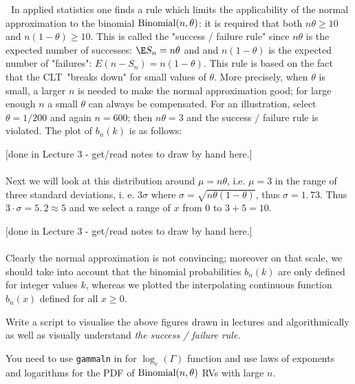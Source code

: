 \textbf{\ }In applied statistics one finds a rule which limits the
applicability of the normal approximation to the binomial $\mbox{{\rm Binomial}}(n,\theta)$: it is
required that both $n\theta\geq 10$ and $n(1-\theta)\geq 10$. This is called the
"success / failure rule" since $n\theta$ is the expected number of successes: $%
\E S_{n}=n\theta$ and and $n(1-\theta)$ is the expected number of "failures": $E\left(
n-S_{n}\right) =n(1-\theta)$. This rule is based on the fact that the CLT\
"breaks down" for small values of $\theta$. More precisely, when $\theta$ is small, a
larger $n$ is needed to make the normal approximation good; for large enough 
$n$ a small $\theta$ can always be compensated. For an illustration, select $%
\theta=1/200$ and again $n=600$; then $n\theta=3$ and the success / failure rule is
violated. The plot of $b_{n}(k)$ is as follows:


{\scriptsize [done in Lecture 3 - get/read notes to draw by hand here.]}\\
\vspace{3cm} 
~\\


Next we will look at this distribution around $\mu =n\theta$, i.e. $%
\mu =3$ in the range of three standard deviations, i. e. $3\sigma $ where $%
\sigma =\sqrt{n\theta(1-\theta)}$, thus $\sigma =1.\,73$. Thus $3\cdot \sigma
=5.\,2\approx 5$ and we select a range of $x$ from $0$ to $3+5=10$. 


{\scriptsize [done in Lecture 3 - get/read notes to draw by hand here.]}\\
\vspace{3cm} 
~\\


Clearly the normal
approximation is not convincing; moreover on that scale, we should take into
account that the binomial probabilities $b_{n}(k)$ are only defined for
integer values $k$, whereas we plotted the interpolating continuous function 
$b_{n}(x)$ defined for all $x\geq 0$.

\begin{labwork}\label{LW:VisualiseSuccessFailureRule}
Write a \Matlab script to visualise the above figures drawn in lectures and algorithmically as well as visually understand {\em the success / failure rule}.

You need to use {\tt gammaln} in \Matlab for $\log_e(\Gamma)$ function and use laws of exponents and logarithms for the PDF of $\mbox{{\rm Binomial}}(n,\theta)$ RVs with large $n$.
\end{labwork}

